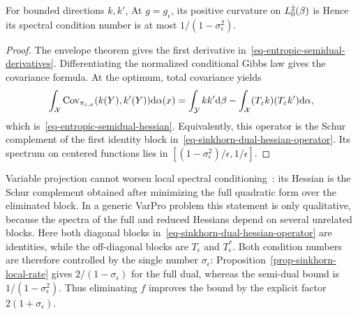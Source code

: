 \begin{prop}\label{prop-sinkhorn-semidual-curvature}
	For bounded directions $k,k'$,
	At $g=g_\epsilon$, its positive curvature on $L_0^2(\beta)$ is
	Hence its spectral condition number is at most
	\(
		1/(1-\sigma_\epsilon^2)
	\).
\end{prop}

\begin{proof}
	The envelope theorem gives the first derivative in~\eqref{eq-entropic-semidual-derivatives}. Differentiating the normalized conditional Gibbs law gives the covariance formula. At the optimum, total covariance yields
	\[
		\int_{\mathcal{X}}
		\operatorname{Cov}_{\pi_{\varepsilon,x}}(k(Y),k'(Y))
		\mathrm{d}\alpha(x)
		=
		\int_{\mathcal{Y}} kk'\mathrm{d}\beta
		-
		\int_{\mathcal{X}}(T_\varepsilon k)(T_\varepsilon k')\mathrm{d}\alpha,
	\]
	which is~\eqref{eq-entropic-semidual-hessian}. Equivalently, this operator is the Schur complement of the first identity block in~\eqref{eq-sinkhorn-dual-hessian-operator}. Its spectrum on centered functions lies in
	\(
		[(1-\sigma_\epsilon^2)/\epsilon,1/\epsilon]
	\).
\end{proof}

Variable projection cannot worsen local spectral conditioning~\cite{golub1973variableprojection,golub2003variableprojection}: its Hessian is the Schur complement obtained after minimizing the full quadratic form over the eliminated block. In a generic VarPro problem this statement is only qualitative, because the spectra of the full and reduced Hessians depend on several unrelated blocks. Here both diagonal blocks in~\eqref{eq-sinkhorn-dual-hessian-operator} are identities, while the off-diagonal blocks are $T_\epsilon$ and $T_\epsilon^*$. Both condition numbers are therefore controlled by the single number $\sigma_\epsilon$: Proposition~\ref{prop-sinkhorn-local-rate} gives $2/(1-\sigma_\epsilon)$ for the full dual, whereas the semi-dual bound is $1/(1-\sigma_\epsilon^2)$. Thus eliminating $f$ improves the bound by the explicit factor $2(1+\sigma_\epsilon)$.

